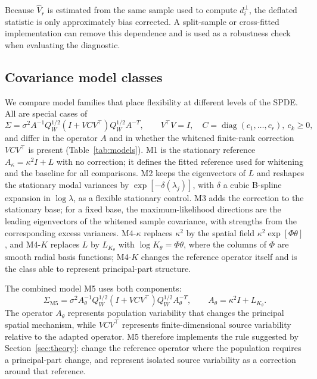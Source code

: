 \documentclass[11pt]{article}
\numberwithin{table}{section}
\numberwithin{figure}{section}
\begin{document}
Because $\widehat V_r$ is estimated from the same sample used to compute $d_i^\perp$, the deflated statistic is only approximately bias corrected. A split-sample or cross-fitted implementation can remove this dependence and is used as a robustness check when evaluating the diagnostic.

\subsection{Covariance model classes}
\label{sec:model_classes}

We compare model families that place flexibility at different levels of the SPDE. All are special cases of
\begin{equation}
    \Sigma
    =
    \sigma^2
    A^{-1}
    Q_W^{1/2}
    \left(I+VCV^\top\right)
    Q_W^{1/2}
    A^{-T},
    \qquad
    V^\top V=I,
    \quad
    C=\operatorname{diag}(c_1,\ldots,c_r),\ c_k\ge0,
    \label{eq:model_family}
\end{equation}
and differ in the operator $A$ and in whether the whitened finite-rank correction $VCV^\top$ is present (Table~\ref{tab:models}). M1 is the stationary reference $A_\kappa=\kappa^2I+L$ with no correction; it defines the fitted reference used for whitening and the baseline for all comparisons. M2 keeps the eigenvectors of $L$ and reshapes the stationary modal variances by $\exp[-\delta(\lambda_j)]$, with $\delta$ a cubic B-spline expansion in $\log\lambda$, as a flexible stationary control. M3 adds the correction to the stationary base; for a fixed base, the maximum-likelihood directions are the leading eigenvectors of the whitened sample covariance, with strengths from the corresponding excess variances. M4-$\kappa$ replaces $\kappa^2$ by the spatial field $\kappa^2\exp[\Phi\theta]$, and M4-$K$ replaces $L$ by $L_{K_\theta}$ with $\log K_\theta=\Phi\theta$, where the columns of $\Phi$ are smooth radial basis functions; M4-$K$ changes the reference operator itself and is the class able to represent principal-part structure.

The combined model M5 uses both components:
\begin{equation}
    \boxed{
    \Sigma_{\mathrm{M5}}
    =
    \sigma^2
    A_\theta^{-1}
    Q_W^{1/2}
    \left(
        I+VCV^\top
    \right)
    Q_W^{1/2}
    A_\theta^{-T},
    \qquad
    A_\theta=\kappa^2I+L_{K_\theta}.
    }
    \label{eq:M5}
\end{equation}
The operator $A_\theta$ represents population variability that changes the principal spatial mechanism, while $VCV^\top$ represents finite-dimensional source variability relative to the adapted operator. M5 therefore implements the rule suggested by Section~\ref{sec:theory}: change the reference operator where the population requires a principal-part change, and represent isolated source variability as a correction around that reference.
\end{document}
